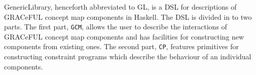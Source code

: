 \documentclass[]{article}
\begin{document}
%
%

GenericLibrary, henceforth abbreviated to GL, is a DSL for descriptions
of GRACeFUL concept map components in Haskell. The DSL is divided in to
two parts. The first part, \texttt{GCM}, allows the user to describe the
interactions of GRACeFUL concept map components and has facilities for
constructing new components from existing ones. The second part,
\texttt{CP}, features primitives for constructing constraint programs
which describe the behaviour of an individual components.
\end{document}
